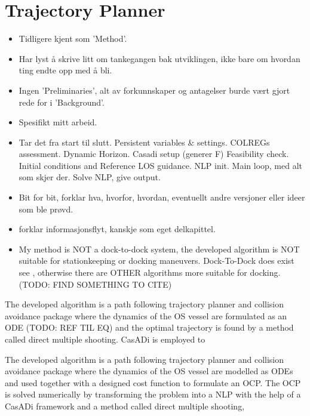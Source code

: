 \section{Trajectory Planner}\label{CHAP: Method}

\begin{itemize}
    \item Tidligere kjent som 'Method'.
    \item Har lyst å skrive litt om tankegangen bak utviklingen, ikke bare om hvordan ting endte opp med å bli.
    \item Ingen 'Preliminaries', alt av forkunnskaper og antagelser burde vært gjort rede for i 'Background'.
    \item Spesifikt mitt arbeid.
    \item Tar det fra start til slutt. 
    \subitem Persistent variables \& settings.
    \subitem COLREGs assessment.
    \subitem Dynamic Horizon.
    \subitem Casadi setup (generer F)
    \subitem Feasibility check.
    \subitem Initial conditions and Reference LOS guidance.
    \subitem NLP init.
    \subitem Main loop, med alt som skjer der.
    \subitem Solve NLP, give output.
    \item Bit for bit, forklar hva, hvorfor, hvordan, eventuellt andre versjoner eller ideer som ble prøvd.
    \item forklar informasjonsflyt, kanskje som eget delkapittel. 
    \item My method is NOT a dock-to-dock system, the developed algorithm is NOT suitable for stationkeeping or docking maneuvers.
    Dock-To-Dock does exist see \cite{WärtsiläDockToDock}, 
    otherwise there are OTHER algorithms more suitable for docking. (TODO: FIND SOMETHING TO CITE)
\end{itemize} 



\iffalse
The developed algorithm is a path following trajectory planner and collision avoidance package where the dynamics of the \gls{OS}
vessel are formulated as an ODE (TODO: REF TIL EQ) and the optimal trajectory is found by a method called direct multiple shooting.
CasADi is employed to 

The developed algorithm is a path following trajectory planner and collision avoidance package where the dynamics of the \gls{OS} vessel
are modelled as ODEs and used together with a designed cost function to formulate an \gls{OCP}. The \gls{OCP} is solved numerically
by transforming the problem into a \gls{NLP} with the help of a CasADi framework and a method called direct multiple shooting, 


